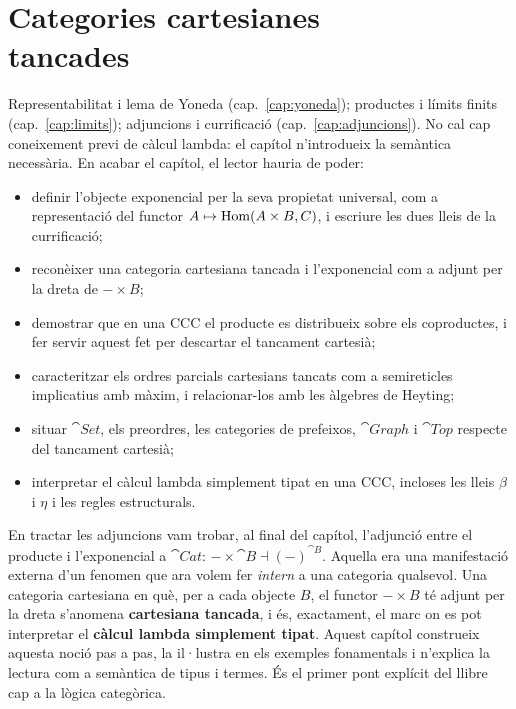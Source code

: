 \chapter[Cartesianes tancades]{\texorpdfstring{Categories cartesianes\\ tancades}{Categories cartesianes tancades}}
\label{cap:cartesianes}

\begin{objectius}
 Representabilitat i lema de Yoneda (cap.~\ref{cap:yoneda}); productes i límits finits (cap.~\ref{cap:limits}); adjuncions i currificació (cap.~\ref{cap:adjuncions}). No cal cap coneixement previ de càlcul lambda: el capítol n'introdueix la semàntica necessària.
 En acabar el capítol, el lector hauria de poder:
\begin{itemize}
  \item definir l'objecte exponencial per la seva propietat universal, com a representació del functor $A\mapsto\operatorname{Hom}(A\times B,C)$, i escriure les dues lleis de la currificació;
  \item reconèixer una categoria cartesiana tancada i l'exponencial com a adjunt per la dreta de $-\times B$;
  \item demostrar que en una CCC el producte es distribueix sobre els coproductes, i fer servir aquest fet per descartar el tancament cartesià;
  \item caracteritzar els ordres parcials cartesians tancats com a semireticles implicatius amb màxim, i relacionar-los amb les àlgebres de Heyting;
  \item situar $\cat{Set}$, els preordres, les categories de prefeixos, $\cat{Graph}$ i $\cat{Top}$ respecte del tancament cartesià;
  \item interpretar el càlcul lambda simplement tipat en una CCC, incloses les lleis $\beta$ i $\eta$ i les regles estructurals.
\end{itemize}
\end{objectius}

En tractar les adjuncions vam trobar, al final del capítol, l'adjunció entre el producte i l'exponencial a $\cat{Cat}$: $-\times\cat{B}\dashv(-)^{\cat{B}}$. Aquella era una manifestació externa d'un fenomen que ara volem fer \emph{intern} a una categoria qualsevol. Una categoria cartesiana en què, per a cada objecte $B$, el functor $-\times B$ té adjunt per la dreta s'anomena \textbf{cartesiana tancada}, i és, exactament, el marc on es pot interpretar el \textbf{càlcul lambda simplement tipat}. Aquest capítol construeix aquesta noció pas a pas, la il·lustra en els exemples fonamentals i n'explica la lectura com a semàntica de tipus i termes. És el primer pont explícit del llibre cap a la lògica categòrica.

